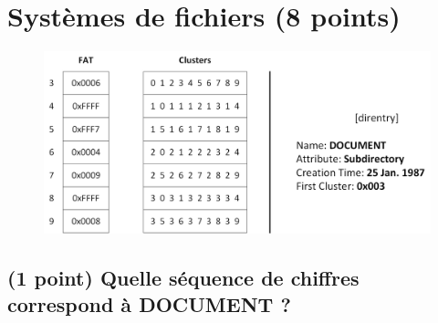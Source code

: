 \documentclass[11pt,a4paper]{article}
\newlength{\LabelWidth}%
\newcommand*{\AdjustSize}[2][l]{\makebox[\LabelWidth][#1]{#2}}%
\begin{document}
\MakeExamTitle                   %


\section{Systèmes de fichiers (8 points)}


\begin{figure}[ht!]
\centering
\centerline{
\includegraphics[scale=1]{FAT1-Direntry.png}
}
\end{figure}


\subsection{(1 point) Quelle séquence de chiffres correspond à \og DOCUMENT \fg ? }

\bigskip


\centerline{
\TextField[comb,
name=reponse1,
charsize=18pt,
maxlen=30,
width=19cm,
height=1cm,
bordercolor=black,
backgroundcolor=white,
bordersep=10pt[]{}
}
\end{document}
